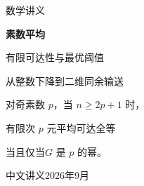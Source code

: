 \documentclass[11pt,a4paper,oneside,openany]{book}
\begin{document}
\frontmatter
\begin{titlepage}
\centering
\vspace*{25mm}
{\sffamily\Large 数学讲义\par}
\vspace{15mm}
{\Huge\bfseries 素数平均\par}
\vspace{7mm}
{\LARGE 有限可达性与最优阈值\par}
\vspace{16mm}
{\large 从整数下降到二维同余输送\par}
\vfill
\begin{minipage}{.79\textwidth}
\large
对奇素数 $p$，当 $n\ge 2p+1$ 时，\par
有限次 $p$ 元平均可达全等\par
\hfill 当且仅当\quad $G$ 是 $p$ 的幂。
\end{minipage}
\vfill
{\large 中文讲义\quad 2026年9月\par}
\end{titlepage}

\tableofcontents
\mainmatter


















\appendix

\backmatter

\end{document}
